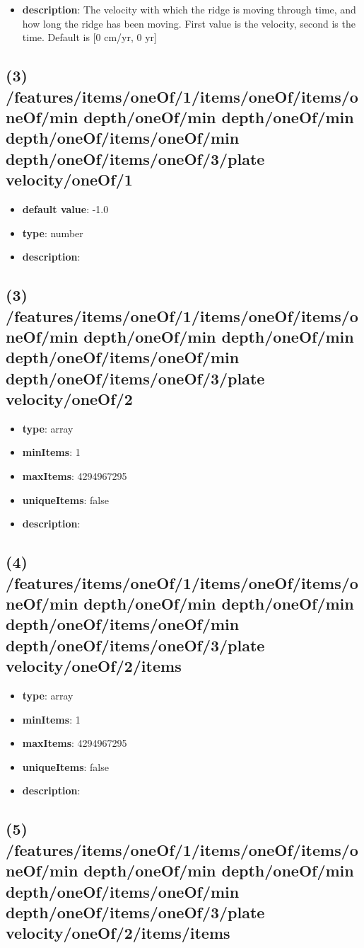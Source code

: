 \begin{itemize}[leftmargin=2em]\item {\bf description}: The velocity with which the ridge is moving through time, and how long the ridge has been moving. First value is the velocity, second is the time. Default is [0 cm/yr, 0 yr]
\end{itemize}
\subsection{(3) /features/items/oneOf/1/items/oneOf/items/oneOf/min depth/oneOf/min depth/oneOf/min depth/oneOf/items/oneOf/min depth/oneOf/items/oneOf/3/plate velocity/oneOf/1}
\begin{itemize}[leftmargin=3em]\item {\bf default value}: -1.0
\item {\bf type}: number
\item {\bf description}: 
\end{itemize}\subsection{(3) /features/items/oneOf/1/items/oneOf/items/oneOf/min depth/oneOf/min depth/oneOf/min depth/oneOf/items/oneOf/min depth/oneOf/items/oneOf/3/plate velocity/oneOf/2}
\begin{itemize}[leftmargin=3em]\item {\bf type}: array
\item {\bf minItems}: 1
\item {\bf maxItems}: 4294967295
\item {\bf uniqueItems}: false
\item {\bf description}: 
\end{itemize}\subsection{(4) /features/items/oneOf/1/items/oneOf/items/oneOf/min depth/oneOf/min depth/oneOf/min depth/oneOf/items/oneOf/min depth/oneOf/items/oneOf/3/plate velocity/oneOf/2/items}
\begin{itemize}[leftmargin=4em]\item {\bf type}: array
\item {\bf minItems}: 1
\item {\bf maxItems}: 4294967295
\item {\bf uniqueItems}: false
\item {\bf description}: 
\end{itemize}\subsection{(5) /features/items/oneOf/1/items/oneOf/items/oneOf/min depth/oneOf/min depth/oneOf/min depth/oneOf/items/oneOf/min depth/oneOf/items/oneOf/3/plate velocity/oneOf/2/items/items}
